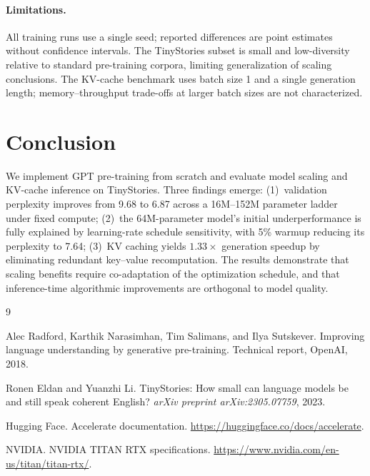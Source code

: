 \documentclass{article}
\begin{document}
\paragraph{Limitations.} All training runs use a single seed; reported differences are point estimates without confidence intervals. The TinyStories subset is small and low-diversity relative to standard pre-training corpora, limiting generalization of scaling conclusions. The KV-cache benchmark uses batch size 1 and a single generation length; memory--throughput trade-offs at larger batch sizes are not characterized.

\section{Conclusion}

We implement GPT pre-training from scratch and evaluate model scaling and KV-cache inference on TinyStories. Three findings emerge: (1)~validation perplexity improves from 9.68 to 6.87 across a 16M--152M parameter ladder under fixed compute; (2)~the 64M-parameter model's initial underperformance is fully explained by learning-rate schedule sensitivity, with 5\% warmup reducing its perplexity to 7.64; (3)~KV caching yields $1.33\times$ generation speedup by eliminating redundant key--value recomputation. The results demonstrate that scaling benefits require co-adaptation of the optimization schedule, and that inference-time algorithmic improvements are orthogonal to model quality.

\begin{thebibliography}{9}

Alec Radford, Karthik Narasimhan, Tim Salimans, and Ilya Sutskever.
\newblock Improving language understanding by generative pre-training.
\newblock Technical report, OpenAI, 2018.

Ronen Eldan and Yuanzhi Li.
\newblock TinyStories: How small can language models be and still speak coherent English?
\newblock \emph{arXiv preprint arXiv:2305.07759}, 2023.

Hugging Face.
\newblock Accelerate documentation.
\newblock \url{https://huggingface.co/docs/accelerate}.

NVIDIA.
\newblock NVIDIA TITAN RTX specifications.
\newblock \url{https://www.nvidia.com/en-us/titan/titan-rtx/}.

\end{thebibliography}
\end{document}
